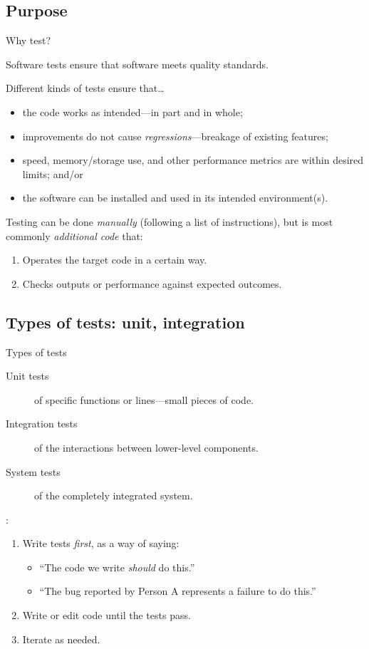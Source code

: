 \documentclass[12pt,aspectratio=169]{beamer}
\begin{document}
\subsection{Purpose}
\begin{frame}{Why test?}

Software tests ensure that software meets quality standards.

\bigskip
Different kinds of tests ensure that…
\begin{itemize}
  \item the code works as intended—in part and in whole;
  \item improvements do not cause \emph{regressions}—breakage of existing features;
  \item speed, memory/storage use, and other performance metrics are within desired limits; and/or
  \item the software can be installed and used in its intended environment(s).
\end{itemize}

\bigskip
Testing can be done \emph{manually} (following a list of instructions), but is most commonly \emph{additional code} that:
\begin{enumerate}
  \item Operates the target code in a certain way.
  \item Checks outputs or performance against expected outcomes.
\end{enumerate}

\end{frame}

\subsection{Types of tests: unit, integration}
\begin{frame}{Types of tests}

\begin{description}
  \item [Unit tests] of specific functions or lines—small pieces of code.
  \item [Integration tests] of the interactions between lower-level components.
  \item [System tests] of the completely integrated system.
\end{description}

\bigskip
{}:

\begin{enumerate}
  \item Write tests \emph{first}, as a way of saying:
    \begin{itemize}
      \item “The code we write \emph{should} do this.”
      \item “The bug reported by Person A represents a failure to do this.”
    \end{itemize}
  \item Write or edit code until the tests pass.
  \item Iterate as needed.
\end{enumerate}

\end{frame}
\end{document}
